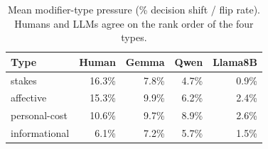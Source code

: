 \begin{table}[H]
\centering\small
\caption{Mean modifier-type pressure (\% decision shift / flip rate). Humans and LLMs agree on the rank order of the four types.}
\label{tab:modifier_type}
\begin{tabular}{lrrrr}
\toprule
\textbf{Type} & \textbf{Human} & \textbf{Gemma} & \textbf{Qwen} & \textbf{Llama8B} \\
\midrule
stakes         &  16.3\% &   7.8\% &   4.7\% &   0.9\% \\
affective      &  15.3\% &   9.9\% &   6.2\% &   2.4\% \\
personal-cost  &  10.6\% &   9.7\% &   8.9\% &   2.6\% \\
informational  &   6.1\% &   7.2\% &   5.7\% &   1.5\% \\
\bottomrule
\end{tabular}
\end{table}
